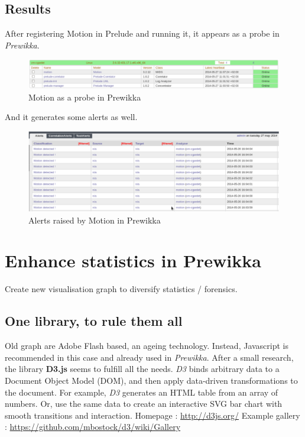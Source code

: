 \documentclass{koala-en}
\begin{document}
\subsection{Results}
After registering Motion in Prelude and running it, it appears as a probe in \emph{Prewikka}.
\begin{figure}[!ht]
  \center
  \includegraphics[width=15cm]{motionprobe.png}
  \caption{Motion as a probe in Prewikka}
\end{figure}

And it generates some alerts as well.
\begin{figure}[!ht]
  \center
  \includegraphics[width=15cm]{motionalerts.png}
  \caption{Alerts raised by Motion in Prewikka}
\end{figure}

\thispagestyle{fancy}
\newpage

\section{Enhance statistics in Prewikka}
Create new visualisation graph to diversify statistics / forensics.
\subsection{One library, to rule them all}
Old graph are Adobe Flash based, an ageing technology.
\newline
\newline
Instead, Javascript is recommended in this case and already used in \emph{Prewikka}. After a small research, the library \textbf{D3.js} seems to fulfill all the needs.
\newline
\newline
\emph{D3} binds arbitrary data to a Document Object Model (DOM), and then apply data-driven transformations to the document. For example, \emph{D3} generates an HTML table from an array of numbers. Or, use the same data to create an interactive SVG bar chart with smooth transitions and interaction.
\newline
\newline
Homepage : \url{http://d3js.org/}
\newline
Example gallery : \url{https://github.com/mbostock/d3/wiki/Gallery}
\end{document}
